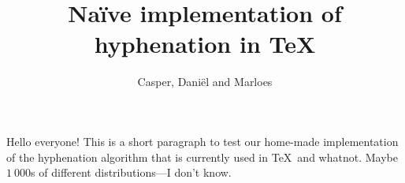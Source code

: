\documentclass{article}
\title{Naïve implementation of hyphenation in \TeX}
\author{Casper, Daniël and Marloes}
\begin{document}
\maketitle
Hello everyone! This is a short paragraph to test our home-made implementation of the hyphenation algorithm that is currently used in \TeX\ and whatnot. Maybe $1~000$s of different distributions---I don't know.
\end{document}
